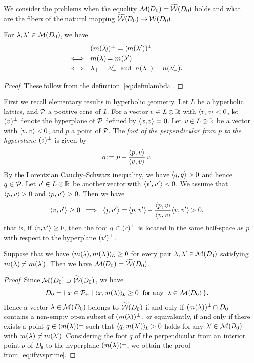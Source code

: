 \documentclass{amsart} %
\begin{document}
%
We consider the problems when 
the equality $\mathord{\mathcal{M}}(D_0)=\widetilde{\mathord{\mathcal{W}}} (D_0)$ holds and 
what are the fibers of the natural mapping $\widetilde{\mathord{\mathcal{W}}} (D_0)\to \mathord{\mathcal{W}}(D_0)$.
%
\begin{lemma}\label{lem:mmequal}
For $\lambda, \lambda^{\prime}\in \mathord{\mathcal{M}}(D_0)$, we have 
\[
\renewcommand{\arraystretch}{1.2}
\begin{array}{cl}
&(m(\lambda))\sperp=(m(\lambda\sprime))\sperp\\
\Longleftrightarrow & m(\lambda)=m(\lambda\sprime) \\
\Longleftrightarrow & \lambdaplus=\lambdaplus\sprime\;\;\textrm{and}\;\; 
n(\lambdaminus)=n(\lambdaminus\sprime).
\end{array}
\]
\end{lemma}
%
\begin{proof}
These follow from the definition~\eqref{eq:defmlambda}.
\end{proof}
%
%
First we recall elementary results in hyperbolic geometry.
Let $L$ be a hyperbolic lattice, and $\mathord{\mathcal{P}}$ a positive cone of $L$.
For a vector $v\in L\otimes\mathord{\mathbb{R}}$ with $\langle v, v \rangle<0$,
let $(v)^{\perp}$ denote the hyperplane of $\mathord{\mathcal{P}}$ defined by $\langle x, v \rangle=0$.
Let $v\in L\otimes\mathord{\mathbb{R}}$ be a vector with $\langle v, v \rangle<0$, and 
$p$ a point of $\mathord{\mathcal{P}}$.
The \emph{foot of the perpendicular from $p$ to the hyperplane $(v)^{\perp}$ }
is given by
\[
q:=p-\frac{\langle p, v \rangle}{\langle v,v \rangle}\, v.
\]
By the Lorentzian Cauchy--Schwarz inequality,
we have $\langle q, q \rangle>0$
and hence 
$q\in \mathord{\mathcal{P}}$.
Let $v^{\prime}\in L\otimes\mathord{\mathbb{R}}$ be another vector with $\langle v^{\prime}, v^{\prime} \rangle<0$.
We assume that $\langle p, v \rangle>0$ and $\langle p, v^{\prime} \rangle>0$.
Then we have
%
\begin{equation}\label{eq:ifvvsprime}
\langle v, v^{\prime} \rangle\ge 0 \;\;\Longrightarrow \;\; \langle q, v^{\prime} \rangle=
\langle p, v^{\prime} \rangle-\dfrac{\langle p, v \rangle}{\langle v,v \rangle} \langle v, v^{\prime} \rangle>0,
\end{equation}
%
that is, if $\langle v, v^{\prime} \rangle\ge 0$, 
then the foot $q\in (v)^{\perp}$ is located in the same half-space as $p$ with respect to the hyperplane 
$(v^{\prime})^{\perp}$.
%
\begin{lemma}\label{lem:pairsofMMM}
Suppose that we have
$\langle m(\lambda), m(\lambda^{\prime}) \rangle_{\hskip -1pt L}\ge 0$
for every  pair $\lambda, \lambda^{\prime}\in  \mathord{\mathcal{M}}(D_0)$
satisfying  $m(\lambda)\ne m(\lambda^{\prime})$.
Then we have 
$\mathord{\mathcal{M}}(D_0)=\widetilde{\mathord{\mathcal{W}}} (D_0)$.
\end{lemma}
%
\begin{proof}
Since $\mathord{\mathcal{M}}(D_0)\supset \widetilde{\mathord{\mathcal{W}}} (D_0)$,
 we have 
 \[
 D_0=\{\,{x\in \mathord{\mathcal{P}}_{+}}\mid {\langle x, m(\lambda) \rangle_{\hskip -1pt L}\ge 0\;\; \textrm{for any} \;\; \lambda\in \mathord{\mathcal{M}}(D_0)} \,\}.
\]
Hence a vector $\lambda\in \mathord{\mathcal{M}}(D_0)$ belongs to $\widetilde{\mathord{\mathcal{W}}} (D_0)$
if and only if 
$(m(\lambda))^{\perp} \cap D_0$ contains a non-empty open subset of $(m(\lambda))^{\perp} $,
or equivalently,
if and only if 
there exists a point $q\in (m(\lambda))^{\perp}$
such that $\langle q, m(\lambda^{\prime}) \rangle_{\hskip -1pt L}> 0$ holds for any $\lambda^{\prime}\in \mathord{\mathcal{M}}(D_0)$
with $m(\lambda)\ne m(\lambda^{\prime})$.
Considering the foot $q$ of 
the perpendicular from an interior point $p$ of $D_0$
to the hyperplane $(m(\lambda))^{\perp}$,
we obtain the proof from~\eqref{eq:ifvvsprime}.
\end{proof}
\end{document}
